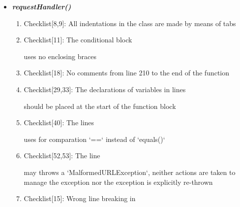 \documentclass[11pt,titlepage]{article} %
\begin{document}
\begin{itemize}
   
   \item \textbf{\textit{requestHandler()}}
    \begin{enumerate}
     \item Checklist[8,9]: All indentations in the class are made by means of tabs
     \item Checklist[11]: The conditional block
      
      uses no enclosing braces
     \item Checklist[18]: No comments from line 210 to the end of the function
     \item Checklist[29,33]: The declarations of variables in lines
      
      
      should be placed at the start of the function block
     \item Checklist[40]: The lines
      
      
      
      
      uses for comparation `==` instead of `equals()`
     \item Checklist[52,53]: The line 
      
      may throws a `MalformedURLException`, neither actions are taken to manage the exception nor the exception is explicitly re-thrown
     \item Checklist[15]: Wrong line breaking in
      

    \end{enumerate}
    

\end{itemize}
\end{document}

